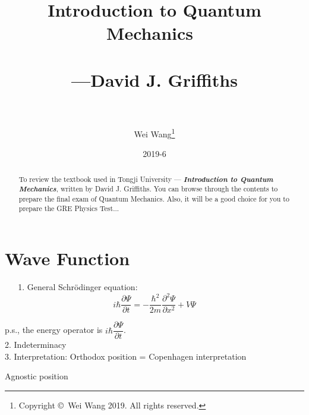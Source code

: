 \documentclass[12pt, 
]{article}
\begin{document}
	\title{{\bf Introduction to Quantum Mechanics}~\\{\bf\Large ~\\ ---David J. Griffiths}}
	\author{~\\~\\Wei Wang\footnote{Copyright \copyright ~Wei Wang 2019. All rights reserved.}}
	\date{2019-6}
	\maketitle

	\thispagestyle{empty}

	\newpage
	\tableofcontents
	\thispagestyle{empty}%

	\newpage
	\begin{abstract}
		To review the textbook used in Tongji University --- {\bf\it Introduction to Quantum Mechanics}, written by David J. Griffiths. You can browse through the contents to prepare the final exam of Quantum Mechanics. Also, it will be a good choice for you to prepare the GRE Physics Test...

	\end{abstract}

	{
	\lhead{}
	\chead{}
	}

	\setcounter{page}{1}%

	\newpage

	\lhead{}
	\chead{}
	\rhead{\leftmark}

	\section{Wave Function}
	$\phantom{aaa}$1. General Schr\"odinger equation:
	\begin{equation}\label{eq:1}
		i\hbar \frac{\partial \varPsi}{\partial t}=-\frac{\hbar^2}{2m}\frac{\partial^2\varPsi}{\partial x^2}+V\varPsi
	\end{equation}
	
	p.s., the energy operator is $i\hbar\dfrac{\partial \varPsi}{\partial t}$.
	~\\

	2. Indeterminacy
	~\\

	3. Interpretation:
	Orthodox position = Copenhagen interpretation
	
	Agnostic position
	~\\
\end{document}
